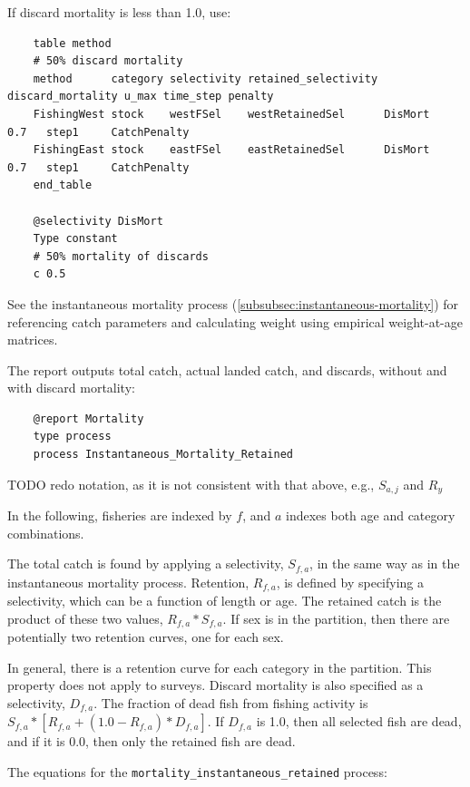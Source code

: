 If discard mortality is less than 1.0, use:

{\small{\begin{verbatim}
    table method
    # 50% discard mortality
    method      category selectivity retained_selectivity discard_mortality u_max time_step penalty
    FishingWest stock    westFSel    westRetainedSel      DisMort           0.7   step1     CatchPenalty
    FishingEast stock    eastFSel    eastRetainedSel      DisMort           0.7   step1     CatchPenalty
    end_table

    @selectivity DisMort
    Type constant
    # 50% mortality of discards
    c 0.5
    \end{verbatim}}}

See the instantaneous mortality process (\ref{subsubsec:instantaneous-mortality}) for referencing catch parameters and calculating weight using empirical weight-at-age matrices.

The report outputs total catch, actual landed catch, and discards, without and with discard mortality:

{\small{\begin{verbatim}
    @report Mortality
    type process
    process Instantaneous_Mortality_Retained
    \end{verbatim}}}

TODO redo notation, as it is not consistent with that above, e.g., $S_{a,j}$ and $R_y$

In the following, fisheries are indexed by $f$, and $a$ indexes both age and category combinations.

The total catch is found by applying a selectivity, $S_{f,a}$, in the same way as in the instantaneous mortality process. Retention, $R_{f,a}$, is defined by specifying a selectivity, which can be a function of length or age. The retained catch is the product of these two values, $R_{f,a} * S_{f,a}$. If sex is in the partition, then there are potentially two retention curves, one for each sex.

In general, there is a retention curve for each category in the partition. This property does not apply to surveys. Discard mortality is also specified as a selectivity, $D_{f,a}$. The fraction of dead fish from fishing activity is $S_{f,a} * [ R_{f,a} + (1.0 - R_{f,a}) * D_{f,a} ]$. If $D_{f,a}$ is 1.0, then all selected fish are dead, and if it is 0.0, then only the retained fish are dead.

The equations for the \texttt{mortality\_instantaneous\_retained} process:

